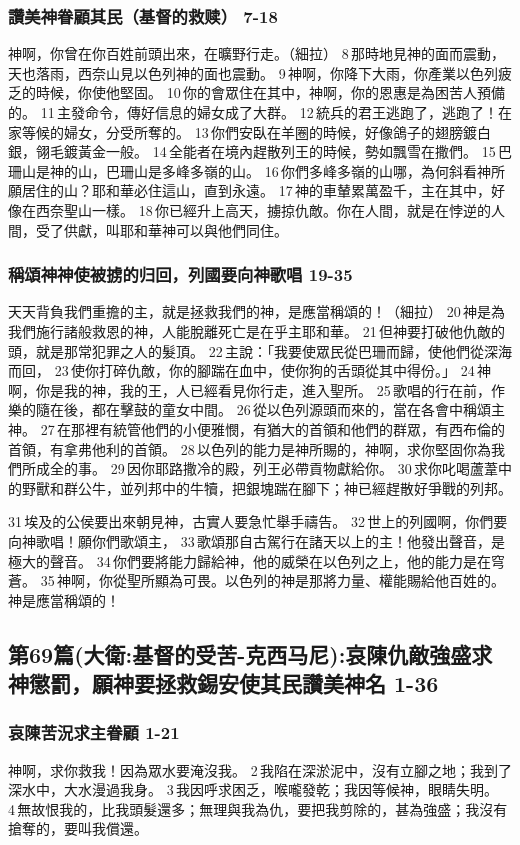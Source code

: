 \subsubsection{讚美神眷顧其民（基督的救赎） 7-18}
神啊，你曾在你百姓前頭出來，在曠野行走。（細拉）
8 那時地見神的面而震動，天也落雨，西奈山見以色列神的面也震動。
9 神啊，你降下大雨，你產業以色列疲乏的時候，你使他堅固。
10 你的會眾住在其中，神啊，你的恩惠是為困苦人預備的。
11 主發命令，傳好信息的婦女成了大群。
12 統兵的君王逃跑了，逃跑了！在家等候的婦女，分受所奪的。
13 你們安臥在羊圈的時候，好像鴿子的翅膀鍍白銀，翎毛鍍黃金一般。
14 全能者在境內趕散列王的時候，勢如飄雪在撒們。
15 巴珊山是神的山，巴珊山是多峰多嶺的山。
16 你們多峰多嶺的山哪，為何斜看神所願居住的山？耶和華必住這山，直到永遠。
17 神的車輦累萬盈千，主在其中，好像在西奈聖山一樣。
18 你已經升上高天，擄掠仇敵。你在人間，就是在悖逆的人間，受了供獻，叫耶和華神可以與他們同住。
\subsubsection{稱頌神神使被掳的归回，列國要向神歌唱 19-35}
天天背負我們重擔的主，就是拯救我們的神，是應當稱頌的！（細拉）
20 神是為我們施行諸般救恩的神，人能脫離死亡是在乎主耶和華。
21 但神要打破他仇敵的頭，就是那常犯罪之人的髮頂。
22 主說：「我要使眾民從巴珊而歸，使他們從深海而回，
23 使你打碎仇敵，你的腳踹在血中，使你狗的舌頭從其中得份。」
24 神啊，你是我的神，我的王，人已經看見你行走，進入聖所。
25 歌唱的行在前，作樂的隨在後，都在擊鼓的童女中間。
26 從以色列源頭而來的，當在各會中稱頌主神。
27 在那裡有統管他們的小便雅憫，有猶大的首領和他們的群眾，有西布倫的首領，有拿弗他利的首領。
28 以色列的能力是神所賜的，神啊，求你堅固你為我們所成全的事。
29 因你耶路撒冷的殿，列王必帶貢物獻給你。
30 求你叱喝蘆葦中的野獸和群公牛，並列邦中的牛犢，把銀塊踹在腳下；神已經趕散好爭戰的列邦。

31 埃及的公侯要出來朝見神，古實人要急忙舉手禱告。
32 世上的列國啊，你們要向神歌唱！願你們歌頌主，
33 歌頌那自古駕行在諸天以上的主！他發出聲音，是極大的聲音。
34 你們要將能力歸給神，他的威榮在以色列之上，他的能力是在穹蒼。
35 神啊，你從聖所顯為可畏。以色列的神是那將力量、權能賜給他百姓的。神是應當稱頌的！

\subsection{第69篇(大衛:基督的受苦-克西马尼):哀陳仇敵強盛求神懲罰，願神要拯救錫安使其民讚美神名 1-36}
\subsubsection{哀陳苦況求主眷顧 1-21}
神啊，求你救我！因為眾水要淹沒我。
2 我陷在深淤泥中，沒有立腳之地；我到了深水中，大水漫過我身。
3 我因呼求困乏，喉嚨發乾；我因等候神，眼睛失明。
4 無故恨我的，比我頭髮還多；無理與我為仇，要把我剪除的，甚為強盛；我沒有搶奪的，要叫我償還。

